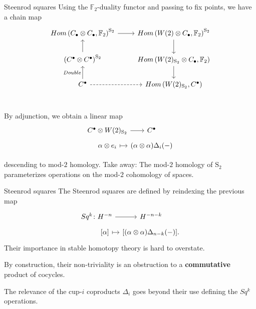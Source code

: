 \documentclass[10pt,t, handout]{beamer} %
\newcommand{\F}{\mathbb{F}}
\renewcommand{\S}{\mathrm{S}}
\begin{document}
\begin{frame}[fragile]{Steenrod squares}
	Using the $\F_2$-duality functor and passing to fix points, we have a chain map 
	\begin{equation*}
	\begin{tikzcd}
	Hom\left(C_\bullet \otimes C_\bullet, \F_2 \right)^{\S_2} \arrow[r] &
	Hom\left(W(2) \otimes C_\bullet, \F_2 \right)^{\S_2} \arrow[d] \\
	\left(C^\bullet \otimes C^\bullet\right)^{\S_2} \arrow[u]&
	Hom\left(W(2)_{\S_2} \otimes C_\bullet, \F_2 \right) \arrow[d] \\
	C^\bullet \arrow[u, "Double"] \arrow[r, dashed]&
	Hom\left(W(2)_{\S_2}, C^\bullet\right) \\
	\end{tikzcd}
	\end{equation*}
	
	\vspace*{-20pt}\pause
	
	By adjunction, we obtain a linear map
	\vspace*{-2pt}
	\begin{equation*}
	\begin{tikzcd}[row sep=tiny, column sep = tiny]
	C^\bullet \otimes W(2)_{\S_2} \arrow[r] &[-10pt] C^\bullet \\
	\alpha \otimes e_i \arrow[r, |->] & (\alpha \otimes \alpha)\Delta_i(-)
	\end{tikzcd}
	\end{equation*}
	
	\vspace*{-5pt}
	
	descending to mod-$2$ homology. \pause \textcolor{pblue}{Take away:} The mod-$2$ homology of $\S_2$ parameterizes operations on the mod-$2$ cohomology of spaces.
\end{frame}

\begin{frame}[fragile]{Steenrod squares}
	\vspace{10pt}
	The Steenrod squares are defined by reindexing the previous map
	\begin{equation*}
	\begin{tikzcd}[row sep=tiny, column sep=tiny]
	Sq^k \colon H^{-n} \arrow[r] & H^{-n-k} \\
	\phantom{Sq^k \colon}{[\alpha]} \arrow[r, |->] & {\left[(\alpha \otimes \alpha)\Delta_{n-k}(-) \right]}.
	\end{tikzcd}
	\end{equation*}
	Their importance in stable homotopy theory is hard to overstate.
	
	\pause \vspace{20pt}
	
	By construction, their non-triviality is an obstruction to a \textbf{commutative} product of cocycles.
	
	\pause \vspace{20pt}
	
	The relevance of the cup-$i$ coproducts $\Delta_i$ goes beyond their use defining the $Sq^k$ operations.
\end{frame}
\end{document}
